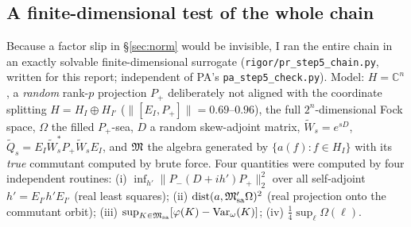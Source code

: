 \documentclass[11pt]{article}
\newcommand{\Wt}{\widetilde W}
\newcommand{\Pp}{P_+}\newcommand{\Pm}{P_-}
\providecommand{\Om}{\Omega}\providecommand{\Gm}{\Gamma}\providecommand{\Qt}{\widetilde Q}
\providecommand{\Msa}{\cM_{\mathrm{sa}}}\providecommand{\Mpsa}{\cM'_{\mathrm{sa}}}
\providecommand{\dist}{\operatorname{dist}}\providecommand{\Var}{\operatorname{Var}}
\providecommand{\norm}[1]{\lVert #1\rVert}\providecommand{\abs}[1]{\lvert #1\rvert}
\begin{document}
\subsection{A finite-dimensional test of the whole chain}\label{sec:chaintest}
Because a factor slip in \S\ref{sec:norm} would be invisible, I ran the entire chain in an exactly
solvable finite-dimensional surrogate (\texttt{rigor/pr\_step5\_chain.py}, written for this report;
independent of PA's \texttt{pa\_step5\_check.py}).  Model: $H=\mathbb C^n$, a \emph{random} rank-$p$
projection $\Pp$ deliberately not aligned with the coordinate splitting $H=H_I\oplus H_{I'}$
($\norm{[E_I,\Pp]}=0.69$--$0.96$), the full $2^n$-dimensional Fock space, $\Om$ the filled $\Pp$-sea,
$D$ a random skew-adjoint matrix, $\Wt_s=e^{sD}$, $\Qt_s=E_I\Wt_s^*\Pp\Wt_sE_I$, and $\mathfrak M$ the
algebra generated by $\{a(f):f\in H_I\}$ with its \emph{true} commutant computed by brute force.
Four quantities were computed by four independent routines:
(i) $\inf_{h'}\norm{\Pm(D+ih')\Pp}_2^2$ over all self-adjoint $h'=E_{I'}h'E_{I'}$ (real least
squares); (ii) $\dist(a,\Mpsa\Om)^2$ (real projection onto the commutant orbit);
(iii) $\sup_{K\in\Msa}[\varphi(K)-\Var_\omega(K)]$; (iv) $\frac14\sup_\ell\Omega(\ell)$.
\end{document}

